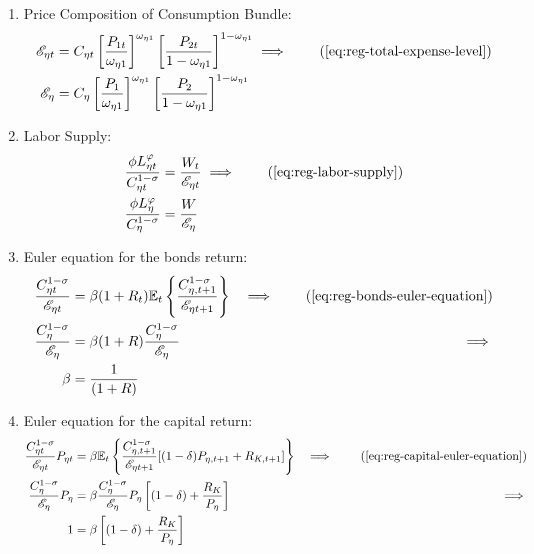\documentclass[../thesis.tex]{subfiles}
\begin{document}
\begin{enumerate}
\begin{comment}
	\item Relative Consumption of Regional Goods:
	\begin{align}
		\frac{C_{\eta 1 t}}{C_{\eta 2 t}} &= \frac{P_{\nu t}}{P_{\eta t}} \cdot \frac{\omega_{\eta 1}}{1 -\omega_{\eta 1}} \implies \tag{\ref{eq:reg-FOC-C1-C2}}\\
		\frac{C_{\eta 1}}{C_{\eta 2}} &= \frac{P_{\nu}}{P_{\eta}} \cdot \frac{\omega_{\eta 1}}{1 -\omega_{\eta 1}} \label{eq:reg-ss-FOC-C1-C2}
	\end{align}
	
\end{comment}

	\item Price Composition of Consumption Bundle:
	\begin{align}
		\te &= C_{\eta t} \left[ \frac{P_{1 t}}{\omega_{\eta 1}} \right]^{\omega_{\eta 1}} \left[ \frac{P_{2 t}}{1 -\omega_{\eta 1}} \right]^{1 -\omega_{\eta 1}} \implies \tag{\ref{eq:reg-total-expense-level}} 
		\\
		\te[] &= C_{\eta} \left[ \frac{P_{1}}{\omega_{\eta 1}} \right]^{\omega_{\eta 1}} \left[ \frac{P_{2}}{1 -\omega_{\eta 1}} \right]^{1 -\omega_{\eta 1}} \label{eq:reg-ss-price-eta-level}
	\end{align}

	\item Labor Supply:
	\begin{align}
		\frac{\phi L_{\eta t}^{\varphi}}{C_{\eta t}^{1-\sigma}} &= \frac{W_t}{\te} \implies \tag{\ref{eq:reg-labor-supply}} \\
		\frac{\phi L_{\eta}^{\varphi}}{C_{\eta}^{1-\sigma}} &= \frac{W}{\te[]} \label{eq:reg-ss-household-labor-supply}
	\end{align}

	\item Euler equation for the bonds return:
	\begin{alignat}{2}
		\frac{ C_{\eta t}^{1-\sigma}}{ \te} &= \beta (1 + R_{t}) \E \left\{ \frac{ C_{\eta, t+1}^{1-\sigma}}{ \te[t+1]} \right\} &\implies \tag{\ref{eq:reg-bonds-euler-equation}} 
		\\
		\frac{ C_{\eta}^{1-\sigma}}{ \te[]} &= \beta (1 + R) \frac{ C_{\eta}^{1-\sigma}}{ \te[]} &\implies \nonumber 
		\\
		\beta &= \frac{1}{(1 + R)} \label{eq:reg-ss-bonds-euler-equation}
	\end{alignat}

	\item Euler equation for the capital return:
	\begin{alignat}{2}
		\frac{ C_{\eta t}^{1-\sigma}}{ \te} P_{\eta t} &= \beta \mathbb{E}_t \left\{ \frac{ C_{\eta, t+1}^{1-\sigma}}{ \te[t+1]} [(1-\delta) P_{\eta, t+1} + R_{K,t+1}] \right\} &\implies \tag{\ref{eq:reg-capital-euler-equation}} \\
		\frac{ C_{\eta}^{1-\sigma}}{ \te[]} P_{\eta} &= \beta \frac{ C_{\eta}^{1-\sigma}}{ \te[]} P_{\eta} \left[ (1-\delta) + \frac{R_{K}}{P_{\eta}} \right] &\implies \nonumber \\
		1 &= \beta \left[ (1-\delta) + \frac{R_{K}}{P_{\eta}} \right] \label{eq:reg-ss-capital-euler-equation}
	\end{alignat}


\end{enumerate}
\end{document}
